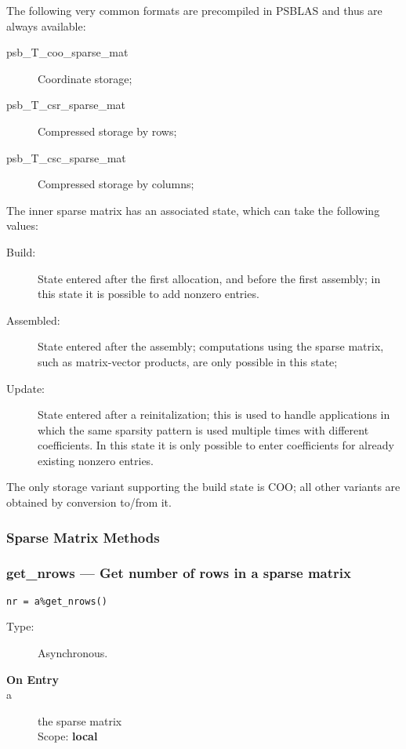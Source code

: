 The following very common formats are precompiled in  PSBLAS and thus
are always available: 
\begin{description}
\item[psb\_T\_coo\_sparse\_mat] Coordinate storage; 
\item[psb\_T\_csr\_sparse\_mat] Compressed storage by rows; 
\item[psb\_T\_csc\_sparse\_mat] Compressed storage by columns; 
\end{description}
The inner sparse matrix has an associated state, which can take the
following values:
\begin{description}
\item[Build:] State entered after the first allocation, and before the
  first assembly; in this state it is possible to add nonzero entries.
\item[Assembled:] State entered after the assembly; computations using
  the sparse matrix, such as matrix-vector products, are only possible
  in this state;
\item[Update:] State entered after a reinitalization; this is used to
  handle applications in which the same sparsity pattern is used
  multiple times with different coefficients. In this state it is only
  possible to enter coefficients for already existing nonzero entries.
\end{description}
The only storage variant supporting the build state is COO; all other
variants are obtained by conversion to/from it. 

\subsubsection{Sparse Matrix Methods}

\subsubsection{get\_nrows --- Get number of  rows in a sparse  matrix}

\begin{verbatim}
nr = a%get_nrows()
\end{verbatim}

\begin{description}
\item[Type:] Asynchronous.
\item[\bf On Entry]
\item[a] the sparse matrix\\
Scope: {\bf local}\\
\end{description}

